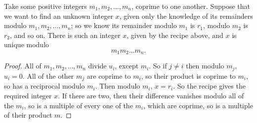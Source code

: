 \begin{theorem}
Take some positive integers \(m_1, m_2, \dots, m_n\), coprime to one another.
Suppose that we want to find an unknown integer \(x\), given only the knowledge of its remainders modulo \(m_1, m_2, \dots, m_n\); so we know its remainder modulo \(m_1\) is \(r_1\), modulo \(m_2\) is \(r_2\), and so on.
There is such an integer \(x\), given by the recipe above, and \(x\) is unique modulo 
\[
m_1 m_2 \dots m_n.
\]
\end{theorem}
\begin{proof}
All of \(m_1, m_2, \dots, m_n\) divide \(u_i\), except \(m_i\).
So if \(j \ne i\) then modulo \(m_j\), \(u_i=0\).
All of the other \(m_j\) are coprime to \(m_i\), so their product is coprime to \(m_i\), so has a reciprocal modulo \(m_i\).
Then modulo \(m_i\), \(x=r_i\).
So the recipe gives the required integer \(x\).
If there are two, then their difference vanishes modulo all of the \(m_i\), so is a multiple of every one of the \(m_i\), which are coprime, so is a multiple of their product \(m\).
\end{proof}
